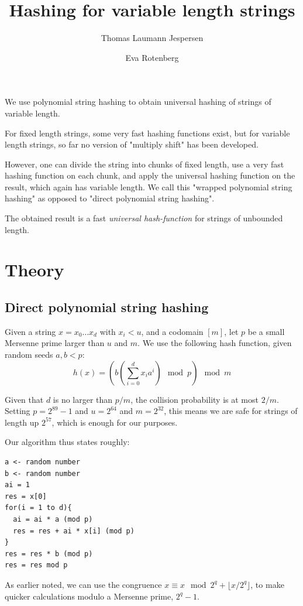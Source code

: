\documentclass[]{article}
\title{Hashing for variable length strings}
\author{Thomas Laumann Jespersen \and Eva Rotenberg}
\begin{document}
\maketitle

We use polynomial string hashing to obtain universal hashing of strings of variable length.

For fixed length strings, some very fast hashing functions exist, but for variable length strings, so far no version of "multiply shift" has been developed. 

However, one can divide the string into chunks of fixed length, use a very fast hashing function on each chunk, and apply the universal hashing function on the result, which again has variable length. We call this "wrapped polynomial string hashing" as opposed to "direct polynomial string hashing".

The obtained result is a fast \emph{universal hash-function} for strings of unbounded length. %

\section{Theory}

\subsection*{Direct polynomial string hashing}

Given a string $x=x_0 \ldots x_d$ with $x_i < u$, and a codomain $[m]$, let $p$ be a small Mersenne prime larger than $u$ and $m$. We use the following hash function, given random seeds $a,b < p$:
\[h(x)= \left( b \left( \sum_{i=0}^{d}x_i a^i \right) \mod p \right) \mod m \]

Given that $d$ is no larger than $p/m$, the collision probability is at most $2/m$. Setting $p=2^{89}-1$ and $u=2^{64}$ and $m=2^{32}$, this means we are safe for strings of length up $2^{57}$, which is enough for our purposes.

Our algorithm thus states roughly:

\begin{verbatim}
a <- random number
b <- random number
ai = 1
res = x[0]
for(i = 1 to d){
  ai = ai * a (mod p)
  res = res + ai * x[i] (mod p)
}
res = res * b (mod p)
res = res mod p
\end{verbatim}

As earlier noted, we can use the congruence $x \equiv x\mod 2^q + \lfloor x / 2^q \rfloor$, to make quicker calculations modulo a Mersenne prime, $2^q -1$.
\end{document}

